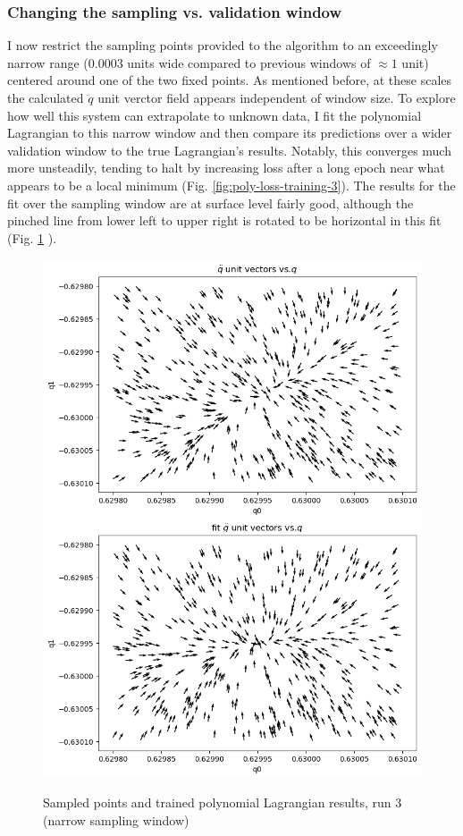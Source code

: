 \documentclass[]{article}
\begin{document}
\subsubsection{Changing the sampling vs. validation window}
I now restrict the sampling points provided to the algorithm to an exceedingly narrow range ($0.0003$ units wide compared to previous windows of $\approx 1$ unit) centered around one of the two fixed points. As mentioned before, at these scales the calculated $\ddot{q}$ unit verctor field appears independent of window size. To explore how well this system can extrapolate to unknown data, I fit the polynomial Lagrangian to this narrow window and then compare its predictions over a wider validation window to the true Lagrangian's results. Notably, this converges much more unsteadily, tending to halt by increasing loss after a long epoch near what appears to be a local minimum (Fig. \ref{fig:poly-loss-training-3}). The results for the fit over the sampling window are at surface level fairly good, although the pinched line from lower left to upper right is rotated to be horizontal in this fit (Fig. \ref{fig:poly-fit-3} ).

\begin{figure}[H]
	\caption{Sampled points and trained polynomial Lagrangian results, run 3 (narrow sampling window)}
	\centering
	\includegraphics[scale=0.60]{poly-fit-3.png}
	\label{fig:poly-fit-3}
\end{figure}
\end{document}
